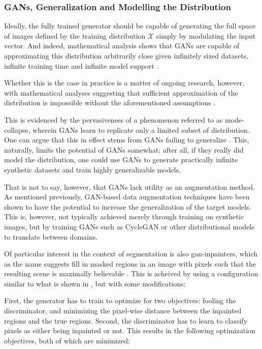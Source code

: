      \subsubsection{GANs, Generalization and Modelling the Distribution}
     Ideally, the fully trained generator should be capable of generating the full space of images defined by the training distribution \(\mathcal{X}\) simply by modulating the input vector. And indeed, mathematical analysis shows that GANs are capable of approximating this distribution arbitrarily close given infinitely sized datasets, infinite training time and infinite model support \cite{gan_first}. 
     
     Whether this is the case in practice is a matter of ongoing research, however, with mathematical analyses suggesting that sufficient approximation of the distribution is impossible without the aforementioned assumptions \cite{gan_learning_distribution}.
     
     This is evidenced by the pervasiveness of a phenomenon referred to as mode-collapse, wherein GANs learn to replicate only a limited subset of distribution. One can argue that this in effect stems from GANs failing to generalize \cite{gan_gen}. This, naturally, limits the potential of GANs somewhat; after all, if they really did model the distribution, one could use GANs to generate practically infinite synthetic datasets and train highly generalizable models. 
     
     That is not to say, however, that GANs lack utility as an augmentation method. As mentioned previously, GAN-based data augmentation techniques have been shown to have the potential to increase the generalization of the target models. This is, however, not typically achieved merely through training on synthetic images, but by training GANs such as CycleGAN \cite{cyclegan} or other distributional models \cite{covid} to translate between domains. 
     
     Of particular interest in the context of segmentation is also \gls{gan}-inpainters, which as the name suggests fill in masked regions in an image with pixels such that the resulting scene is maximally believable \cite{inpainter_basic}. This is acheived by using a configuration similar to what is shown in , but with some modifications:
     
     First, the generator has to train to optimize for two objectives: fooling the discriminator, and minimizing the pixel-wise distance between the inpainted regions and the true regions. Second, the discriminator has to learn to classify pixels as either being inpainted or not. This results in the following optimization objectives, both of which are minimized:
     
